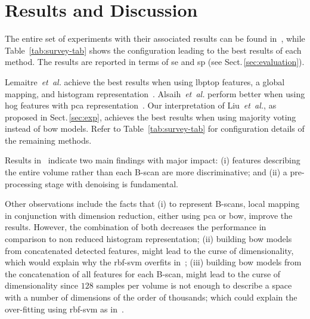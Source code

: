 \section{Results and Discussion}\label{sec:results}\label{sec:discussion}

The entire set of experiments with their associated results can be found in~\cite{rethinopaty20016apr-repoICPR}, while Table~\ref{tab:survey-tab} shows the configuration leading to the best results of each method.
The results are reported in terms of \gls{se} and \gls{sp} (see Sect.\,\ref{sec:evaluation}).

Lemaitre~\emph{et~al.} achieve the best results when using \gls{lbptop} features, a global mapping, and histogram representation~\cite{Lemaintre2015miccaiOCT}.
Alsaih~\emph{et~al.} perform better when using \gls{hog} features with \gls{pca} representation~\cite{Alsaih2016apr-repoICPR}.
Our interpretation of Liu~\emph{et~al.}, as proposed in Sect.\,\ref{sec:exp}, achieves the best results when using majority voting instead of \gls{bow} models.
Refer to Table~\ref{tab:survey-tab} for configuration details of the remaining methods.

Results in~\cite{rethinopaty20016apr-repoICPR} indicate two main findings with major impact:
(i) features describing the entire volume rather than each B-scan are more discriminative; and
(ii) a pre-processing stage with denoising is fundamental.

Other observations include the facts that
(i) to represent B-scans, local mapping in conjunction with dimension reduction, either using \gls{pca} or \gls{bow}, improve the results.
However, the combination of both decreases the performance in comparison to non reduced histogram representation;
(ii) building \gls{bow} models from concatenated detected features, might lead to the curse of dimensionality, which would explain why the \gls{rbf}-\gls{svm} overfits in~\cite{liu20016apr-repoICPR};
(iii) building \gls{bow} models from the concatenation of all features for each B-scan, might lead to the curse of dimensionality since $128$ samples per volume is not enough to describe a space with a number of dimensions of the order of thousands; which could explain the over-fitting using \gls{rbf}-\gls{svm} as in~\cite{liu20016apr-repoICPR}.
